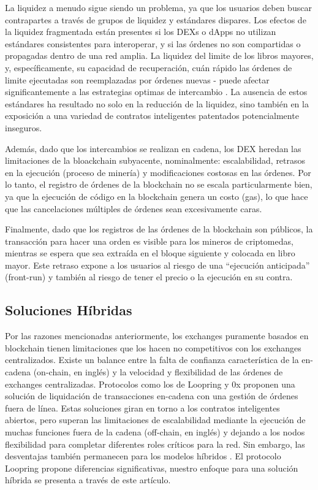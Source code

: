 \documentclass[UTF8,nofonts]{article}
\begin{document}
\begin{multicols}{2}
La liquidez a menudo sigue siendo un problema, ya que los usuarios deben buscar contrapartes a trav\'es de grupos de liquidez y est\'andares dispares. Los efectos de la liquidez fragmentada est\'an presentes si los DEXs o dApps no utilizan est\'andares consistentes para interoperar, y si las \'ordenes no son compartidas o propagadas dentro de una red amplia. La liquidez del limite de los libros mayores, y, espec\'ificamente, su capacidad de recuperaci\'on, cu\'an r\'apido las \'ordenes de limite ejecutadas son reemplazadas por \'ordenes nuevas -  puede afectar significantemente a las estrategias optimas de intercambio \cite{limitorderliquidity}. La ausencia de estos est\'andares ha resultado no solo en la reducci\'on de la liquidez, sino tambi\'en en la exposici\'on a una variedad de contratos inteligentes patentados potencialmente inseguros.

Adem\'as, dado que los intercambios se realizan en cadena, los DEX heredan las limitaciones de la bloackchain subyacente, nominalmente: escalabilidad, retrasos en la ejecuci\'on (proceso de miner\'ia) y modificaciones costosas en las \'ordenes. Por lo tanto, el registro de \'ordenes de la blockchain no se escala particularmente bien, ya que la ejecuci\'on de c\'odigo en la blockchain genera un costo (gas), lo que hace que las cancelaciones m\'ultiples de \'ordenes sean excesivamente caras.

Finalmente, dado que los registros de las \'ordenes de la blockchain son p\'ublicos, la transacci\'on para hacer una orden es visible para los mineros de criptomedas, mientras se espera que sea extra\'ida en el bloque siguiente y colocada en libro mayor. Este retraso expone a los usuarios al riesgo de una \enquote{ejecuci\'on anticipada} (front-run) y tambi\'en al riesgo de tener el precio o la ejecuci\'on en su contra.

\subsection{Soluciones H\'ibridas}
Por las razones mencionadas anteriormente, los exchanges puramente basados en blockchain tienen limitaciones que los hacen no competitivos con los exchanges centralizados. Existe un balance entre la falta de confianza caracter\'istica de la en-cadena (on-chain, en ingl\'es) y la velocidad y flexibilidad de las \'ordenes de exchanges centralizadas. Protocolos como los de Loopring y 0x  \cite{warren20170x} proponen una soluci\'on de liquidaci\'on de transacciones en-cadena con una gesti\'on de \'ordenes fuera de l\'inea. Estas soluciones giran en torno a los contratos inteligentes abiertos, pero superan las limitaciones de escalabilidad mediante la ejecuci\'on de muchas funciones fuera de la cadena (off-chain, en ingl\'es) y dejando a los nodos flexibilidad para completar diferentes roles cr\'iticos para la red. Sin embargo, las desventajas tambi\'en permanecen para los modelos h\'ibridos  \cite{costofdecent}. El protocolo Loopring propone diferencias significativas, nuestro enfoque para una soluci\'on h\'ibrida se presenta a trav\'es de este art\'iculo.


\end{multicols}
\end{document}
